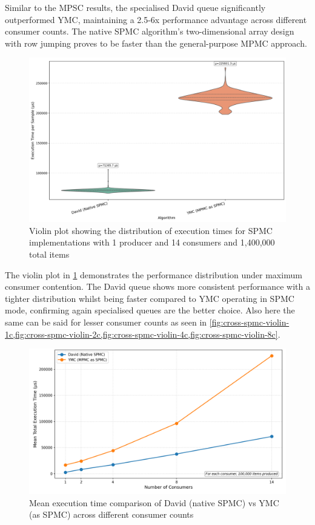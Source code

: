 Similar to the \ac{MPSC} results, the specialised David queue significantly outperformed \ac{YMC}, maintaining a 2.5-6x performance advantage across different consumer counts. The native \ac{SPMC} algorithm's two-dimensional array design with row jumping proves to be faster than the general-purpose \ac{MPMC} approach.

\begin{figure}[htb]
\centering
\caption{Violin plot showing the distribution of execution times for \ac{SPMC} implementations with 1 producer and 14 consumers and 1,400,000 total items}
\label{fig:spmc-violin-14c}
\includegraphics[width=\textwidth]{images/results/best_in_spmc_performance_violin_1P14C.png}
\end{figure}

The violin plot in \cref{fig:spmc-violin-14c} demonstrates the performance distribution under maximum consumer contention. The David queue shows more consistent performance with a tighter distribution whilst being faster compared to \ac{YMC} operating in SPMC mode, confirming again specialised queues are the better choice. Also here the same can be said for lesser consumer counts as seen in \cref{fig:cross-spmc-violin-1c,fig:cross-spmc-violin-2c,fig:cross-spmc-violin-4c,fig:cross-spmc-violin-8c}.

\begin{figure}[htb]
\centering
\caption{Mean execution time comparison of David (native SPMC) vs YMC (as SPMC) across different consumer counts}
\label{fig:cross-spmc-mean}
\includegraphics[width=\textwidth]{images/results/best_in_spmc_mean_performance_vs_consumers.png}
\end{figure}